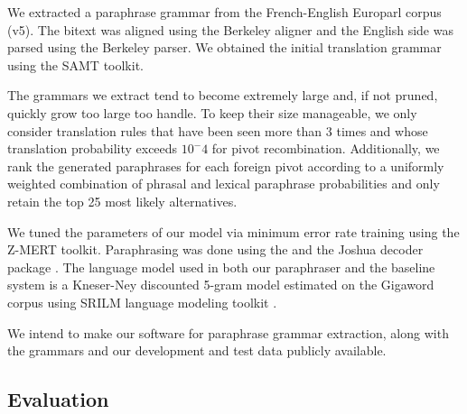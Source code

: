 \documentclass[11pt]{article}
\begin{document}
We extracted a paraphrase grammar from the French-English Europarl
corpus (v5). The bitext was aligned using the Berkeley aligner and the
English side was parsed using the Berkeley parser. We obtained the
initial translation grammar using the SAMT toolkit. 

The grammars we extract tend to become extremely large and, if not
pruned, quickly grow too large too handle. To keep their size
manageable, we only consider translation rules that have been seen
more than 3 times and whose translation probability exceeds $10^-4$
for pivot recombination. Additionally, we rank the generated
paraphrases for each foreign pivot according to a uniformly weighted
combination of phrasal and lexical paraphrase probabilities and only
retain the top 25 most likely alternatives.

We tuned the parameters of our model via minimum error rate training
using the Z-MERT toolkit\cite{Zaidan2009}. Paraphrasing was done using
the and the Joshua decoder package \cite{Joshua-WMT}. The language
model used in both our paraphraser and the 
baseline system is a Kneser-Ney discounted 5-gram model estimated on
the Gigaword corpus using SRILM language modeling toolkit
\cite{SRILM}.

We intend to make our software for paraphrase grammar extraction,
along with the grammars and our development and test data publicly
available.

\subsection{Evaluation} \label{evaluation}
\end{document}

